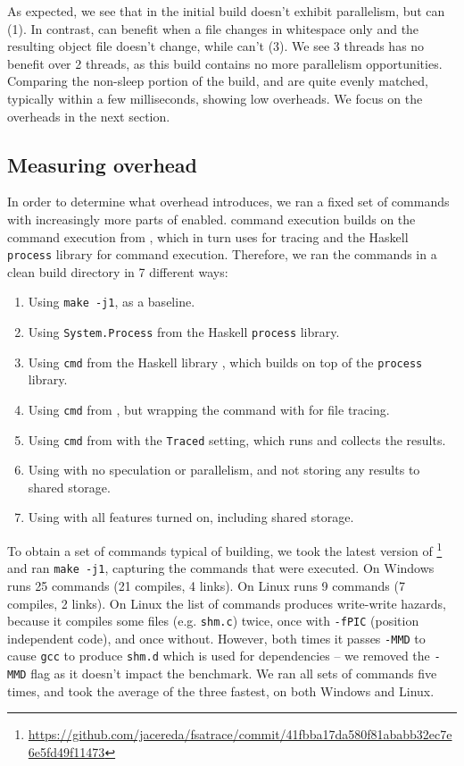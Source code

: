As expected, we see that in the initial build \Rattle doesn't exhibit parallelism, but \Make can (1). In contrast, \Rattle can benefit when a file changes in whitespace only and the resulting object file doesn't change, while \Make can't (3). We see 3 threads has no benefit over 2 threads, as this build contains no more parallelism opportunities. Comparing the non-sleep portion of the build, \Make and \Rattle are quite evenly matched, typically within a few milliseconds, showing low overheads. We focus on the overheads in the next section.

\subsection{Measuring overhead}
\label{sec:eval:overhead}

In order to determine what overhead \Rattle introduces, we ran a fixed set of commands with increasingly more parts of \Rattle enabled. \Rattle command execution builds on the command execution from \Shake \cite{shake}, which in turn uses \Fsatrace for tracing and the Haskell \texttt{process} library for command execution. Therefore, we ran the commands in a clean build directory in 7 different ways:

\begin{enumerate}
\item Using \texttt{make -j1}, as a baseline.
\item Using \texttt{System.Process} from the Haskell \texttt{process} library.
\item Using \texttt{cmd} from the Haskell \Shake library \cite{shake}, which builds on top of the \texttt{process} library.
\item Using \texttt{cmd} from \Shake, but wrapping the command with \Fsatrace for file tracing.
\item Using \texttt{cmd} from \Shake with the \texttt{Traced} setting, which runs \Fsatrace and collects the results.
\item Using \Rattle with no speculation or parallelism, and not storing any results to shared storage.
\item Using \Rattle with all features turned on, including shared storage.
\end{enumerate}

To obtain a set of commands typical of building, we took the latest version of \Fsatrace\footnote{\url{https://github.com/jacereda/fsatrace/commit/41fbba17da580f81ababb32ec7e6e5fd49f11473}} and ran \texttt{make -j1}, capturing the commands that were executed. On Windows \Fsatrace runs 25 commands (21 compiles, 4 links). On Linux \Fsatrace runs 9 commands (7 compiles, 2 links). On Linux the list of commands produces write-write hazards, because it compiles some files (e.g. \texttt{shm.c}) twice, once with \texttt{-fPIC} (position independent code), and once without. However, both times it passes \texttt{-MMD} to cause \texttt{gcc} to produce \texttt{shm.d} which is used for dependencies -- we removed the \texttt{-MMD} flag as it doesn't impact the benchmark. We ran all sets of commands five times, and took the average of the three fastest, on both Windows and Linux.

